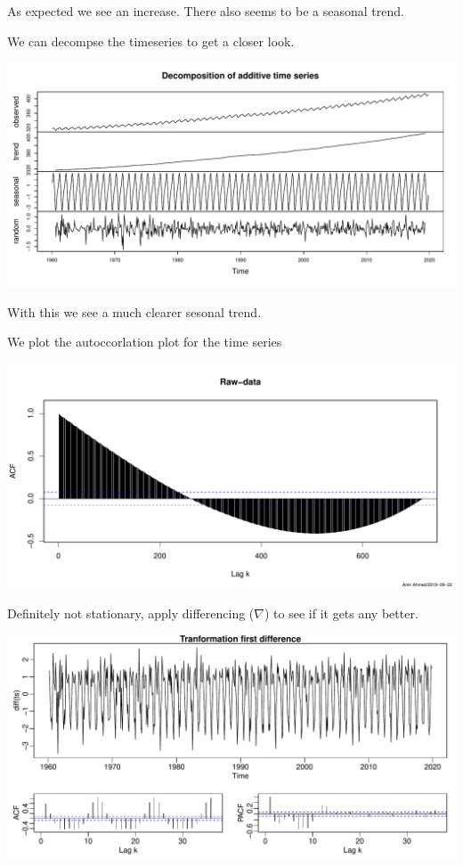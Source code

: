 \documentclass[]{article}
\begin{document}
As expected we see an increase. There also seems to be a seasonal trend.

We can decompse the timeseries to get a closer look.

\begin{center}\includegraphics{Tidsrekkerex4_files/figure-latex/unnamed-chunk-4-1} \end{center}

With this we see a much clearer sesonal trend.

We plot the autoccorlation plot for the time series

\begin{center}\includegraphics{Tidsrekkerex4_files/figure-latex/unnamed-chunk-5-1} \end{center}

Definitely not stationary, apply differencing (\(\nabla\)) to see if it
gets any better.

\begin{center}\includegraphics{Tidsrekkerex4_files/figure-latex/unnamed-chunk-6-1} \end{center}
\end{document}
